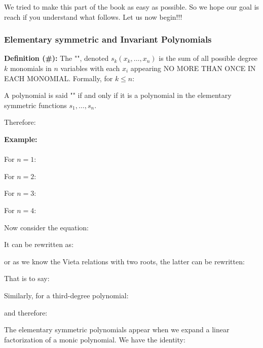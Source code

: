  	We tried to make this part of the book as easy as possible. So we hope our goal is reach if you understand what follows. Let us now begin!!!
 	
 	\subsubsection{Elementary symmetric and Invariant Polynomials}
 	\textbf{Definition (\#\mydef):} The "", denoted $s_k(x_k,\ldots , x_n)$ is the sum of all possible degree $k$ monomials in $n$ variables with each $x_i$ appearing NO MORE THAN ONCE IN EACH MONOMIAL. Formally, for $k\leq n$:
	
	A polynomial is said "" if and only if it is a polynomial in the elementary symmetric functions $s_1,\ldots, s_n$.

	Therefore:
	
	\begin{tcolorbox}[colframe=black,colback=white,sharp corners]
	\textbf{{\Large {}}Example:}\\\\
	For $n = 1$:
	
	For $n = 2$:
	
	For $n = 3$:
	
	For $n = 4$:
	
	Now consider the equation:
	
	It can be rewritten as:
	
	or as we know the Vieta relations with two roots, the latter can be rewritten:
	
		\end{tcolorbox}
	
	\pagebreak
	\begin{tcolorbox}[colframe=black,colback=white,sharp corners]
	That is to say:
	
	Similarly, for a third-degree polynomial:
	
	and therefore:
	
	\end{tcolorbox}

	The elementary symmetric polynomials appear when we expand a linear factorization of a monic polynomial. We have the identity:
	
